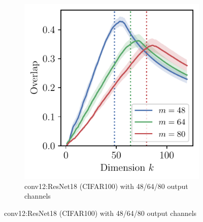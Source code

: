 \begin{figure}[H]
    \captionsetup[sub]{format=subcaptionformat}
    \centering
    \begin{subfigure}[h]{0.32\columnwidth}
        \centering
        \captionsetup{justification=centering}
        \includegraphics[width=\textwidth]{Figures/SubspaceOverlap/NeurIPS/Overlap_ResNet_conv12.conv1.pdf}
        \vspace{-0.2in}
        \caption{conv12:ResNet18 (CIFAR100) with 48/64/80 output channels}


\end{subfigure}
\end{figure}
